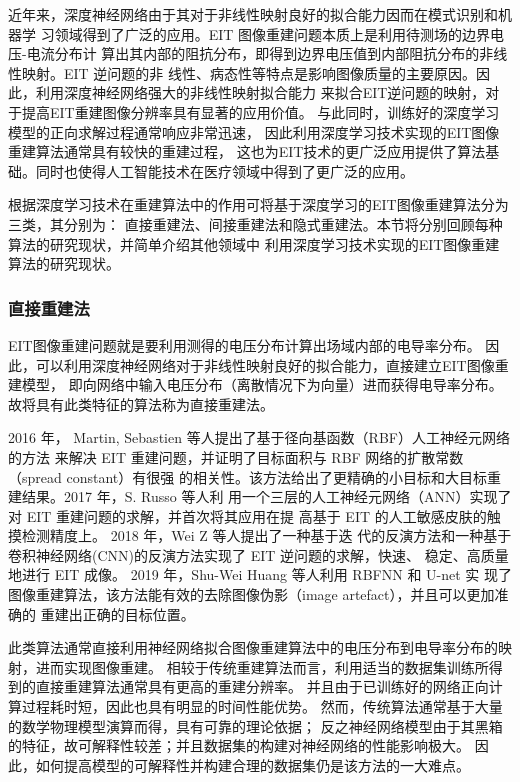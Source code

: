 
近年来，深度神经网络由于其对于非线性映射良好的拟合能力因而在模式识别和机器学
习领域得到了广泛的应用。EIT 图像重建问题本质上是利用待测场的边界电压-电流分布计
算出其内部的阻抗分布，即得到边界电压值到内部阻抗分布的非线性映射。EIT 逆问题的非
线性、病态性等特点是影响图像质量的主要原因。因此，利用深度神经网络强大的非线性映射拟合能力
来拟合EIT逆问题的映射，对于提高EIT重建图像分辨率具有显著的应用价值。
与此同时，训练好的深度学习模型的正向求解过程通常响应非常迅速，
因此利用深度学习技术实现的EIT图像重建算法通常具有较快的重建过程，
这也为EIT技术的更广泛应用提供了算法基础。同时也使得人工智能技术在医疗领域中得到了更广泛的应用。 

根据深度学习技术在重建算法中的作用可将基于深度学习的EIT图像重建算法分为三类，其分别为：
直接重建法、间接重建法和隐式重建法。本节将分别回顾每种算法的研究现状，并简单介绍其他领域中
利用深度学习技术实现的EIT图像重建算法的研究现状。

\subsubsection{直接重建法}

EIT图像重建问题就是要利用测得的电压分布计算出场域内部的电导率分布。
因此，可以利用深度神经网络对于非线性映射良好的拟合能力，直接建立EIT图像重建模型，
即向网络中输入电压分布（离散情况下为向量）进而获得电导率分布。
故将具有此类特征的算法称为直接重建法。

2016 年， Martin, Sebastien 等人提出了基于径向基函数（RBF）人工神经元网络的方法
来解决 EIT 重建问题，并证明了目标面积与 RBF 网络的扩散常数（spread constant）有很强
的相关性。该方法给出了更精确的小目标和大目标重建结果\cite{Ontheinf}。2017 年，S. Russo 等人利
用一个三层的人工神经元网络（ANN）实现了对 EIT 重建问题的求解，并首次将其应用在提
高基于 EIT 的人工敏感皮肤的触摸检测精度上。\cite{8233910} 2018 年，Wei Z 等人提出了一种基于迭
代的反演方法和一种基于卷积神经网络(CNN)的反演方法实现了 EIT 逆问题的求解，快速、
稳定、高质量地进行 EIT 成像。\cite{8606211} 2019 年，Shu-Wei Huang 等人利用 RBFNN 和 U-net 实
现了图像重建算法，该方法能有效的去除图像伪影（image artefact），并且可以更加准确的
重建出正确的目标位置\cite{8856781}。

此类算法通常直接利用神经网络拟合图像重建算法中的电压分布到电导率分布的映射，进而实现图像重建。
相较于传统重建算法而言，利用适当的数据集训练所得到的直接重建算法通常具有更高的重建分辨率。
并且由于已训练好的网络正向计算过程耗时短，因此也具有明显的时间性能优势。
然而，传统算法通常基于大量的数学物理模型演算而得，具有可靠的理论依据；
反之神经网络模型由于其黑箱的特征，故可解释性较差；并且数据集的构建对神经网络的性能影响极大。
因此，如何提高模型的可解释性并构建合理的数据集仍是该方法的一大难点。 


